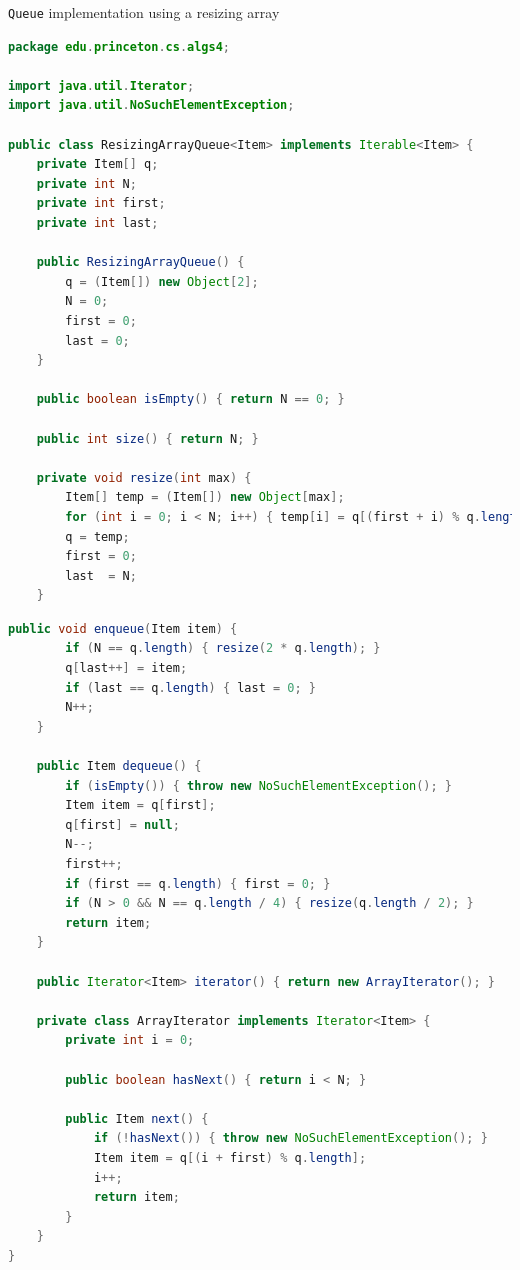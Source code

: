 \documentclass[8pt,a4paper,compress]{beamer}
\begin{document}
\begin{frame}[fragile]
\pause

\lstinline{Queue} implementation using a resizing array
\begin{lstlisting}[language=Java]
package edu.princeton.cs.algs4;

import java.util.Iterator;
import java.util.NoSuchElementException;

public class ResizingArrayQueue<Item> implements Iterable<Item> {
    private Item[] q; 
    private int N; 
    private int first; 
    private int last;

    public ResizingArrayQueue() {
        q = (Item[]) new Object[2];
        N = 0;
        first = 0;
        last = 0;
    }

    public boolean isEmpty() { return N == 0; }

    public int size() { return N; }

    private void resize(int max) {
        Item[] temp = (Item[]) new Object[max];
        for (int i = 0; i < N; i++) { temp[i] = q[(first + i) % q.length]; }
        q = temp;
        first = 0;
        last  = N;
    }
\end{lstlisting}
\end{frame}

\begin{frame}[fragile]
\pause

\begin{lstlisting}[language=Java]
    public void enqueue(Item item) {
        if (N == q.length) { resize(2 * q.length); }
        q[last++] = item; 
        if (last == q.length) { last = 0; }
        N++;
    }

    public Item dequeue() {
        if (isEmpty()) { throw new NoSuchElementException(); }
        Item item = q[first];
        q[first] = null; 
        N--;
        first++;
        if (first == q.length) { first = 0; }
        if (N > 0 && N == q.length / 4) { resize(q.length / 2); } 
        return item;
    }

    public Iterator<Item> iterator() { return new ArrayIterator(); }

    private class ArrayIterator implements Iterator<Item> {
        private int i = 0;
        
        public boolean hasNext() { return i < N; }

        public Item next() {
            if (!hasNext()) { throw new NoSuchElementException(); }
            Item item = q[(i + first) % q.length];
            i++;
            return item;
        }
    }
}
\end{lstlisting}
\end{frame}
\end{document}
